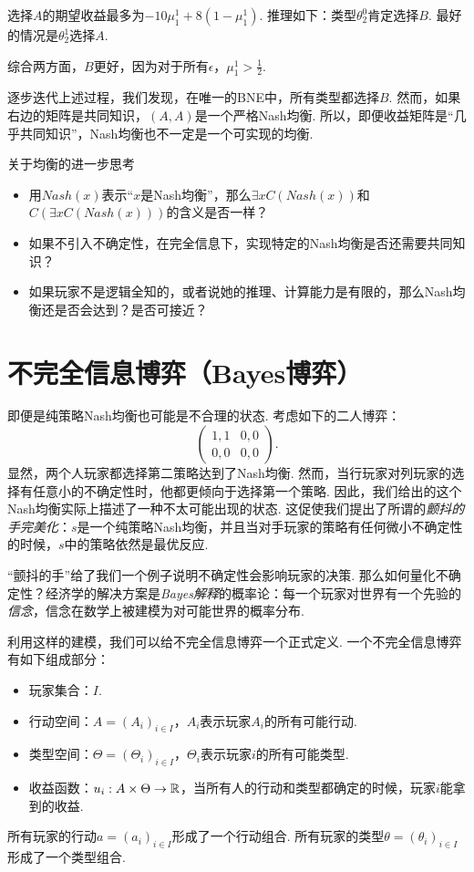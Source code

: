 选择$A$的期望收益最多为$-10\mu_1^1 + 8(1 - \mu_1^1)$. 推理如下：类型$\theta_2^0$肯定选择$B$. 最好的情况是$\theta_2^1$选择$A$. 

综合两方面，$B$更好，因为对于所有$\epsilon$，$\mu_1^1 > \frac{1}{2}$. 

逐步迭代上述过程，我们发现，在唯一的BNE中，所有类型都选择$B$. 然而，如果右边的矩阵是共同知识，$(A,A)$是一个严格Nash均衡. 所以，即便收益矩阵是“几乎共同知识”，Nash均衡也不一定是一个可实现的均衡. 

\begin{remark}
    {关于均衡的进一步思考}
\begin{itemize}
    \item 用$Nash(x)$表示“$x$是Nash均衡”，那么$\exists x C(Nash(x))$和$C(\exists x C(Nash(x)))$的含义是否一样？
    \item 如果不引入不确定性，在完全信息下，实现特定的Nash均衡是否还需要共同知识？
    \item 如果玩家不是逻辑全知的，或者说她的推理、计算能力是有限的，那么Nash均衡还是否会达到？是否可接近？
\end{itemize}
\end{remark}



\section{不完全信息博弈（Bayes博弈）}

即便是纯策略Nash均衡也可能是不合理的状态. 考虑如下的二人博弈：
    \[\begin{pmatrix}
    1,1&0,0\\
    0,0&0,0
    \end{pmatrix}.\]
显然，两个人玩家都选择第二策略达到了Nash均衡. 然而，当行玩家对列玩家的选择有任意小的不确定性时，他都更倾向于选择第一个策略. 因此，我们给出的这个Nash均衡实际上描述了一种不太可能出现的状态. 这促使我们提出了所谓的\emph{颤抖的手完美化}：$s$是一个纯策略Nash均衡，并且当对手玩家的策略有任何微小不确定性的时候，$s$中的策略依然是最优反应.

“颤抖的手”给了我们一个例子说明不确定性会影响玩家的决策. 那么如何量化不确定性？经济学的解决方案是\emph{Bayes解释}的概率论：每一个玩家对世界有一个先验的\emph{信念}，信念在数学上被建模为对可能世界的概率分布.

利用这样的建模，我们可以给不完全信息博弈一个正式定义. 一个不完全信息博弈有如下组成部分：
\begin{itemize}
\item 玩家集合：$I$.
\item 行动空间：$A=(A_i)_{i\in I}$，$A_i$表示玩家$A_i$的所有可能行动.
\item 类型空间：$\Theta=(\Theta_i)_{i\in I}$，$\Theta_i$表示玩家$i$的所有可能类型.
\item 收益函数：$u_i:A\times\Theta\to\mathbb{R}$，当所有人的行动和类型都确定的时候，玩家$i$能拿到的收益.
\end{itemize}
所有玩家的行动$a=(a_i)_{i\in I}$形成了一个行动组合. 所有玩家的类型$\theta=(\theta_i)_{i\in I}$形成了一个类型组合.


